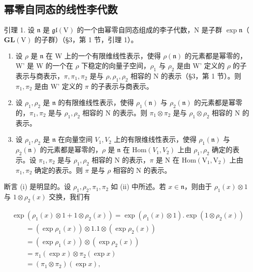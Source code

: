 \subsection{幂零自同态的线性李代数}

引理 1. 设 \(\mathfrak{n}\) 是 \(\mathfrak{gl}(\mathrm{V})\) 的一个由幂零自同态组成的李子代数，\(\mathrm{N}\) 是子群 \(\exp \mathfrak{n}\)（\(\mathbf{GL}(\mathrm{V})\) 的子群）（§3，第 1 节，引理 1）。

\begin{enumerate}
\def\labelenumi{(\roman{enumi})}
\item
  设 \(\rho\) 是 \(\mathfrak{n}\) 在 W 上的一个有限维线性表示，使得 \(\rho(\mathfrak{n})\) 的元素都是幂零的，W' 是 W 的一个在 \(\rho\) 下稳定的向量子空间，\(\rho_1\) 与 \(\rho_2\) 是由 W' 定义的 \(\rho\) 的子表示与商表示，\(\pi, \pi_1, \pi_2\) 是与 \(\rho, \rho_1, \rho_2\) 相容的 N 的表示（§3，第 1 节）。则 \(\pi_1, \pi_2\) 是由 W' 定义的 \(\pi\) 的子表示与商表示。
\item
  设 \(\rho_1, \rho_2\) 是 \(\mathfrak{n}\) 的有限维线性表示，使得 \(\rho_1(\mathfrak{n})\) 与 \(\rho_2(\mathfrak{n})\) 的元素都是幂零的，\(\pi_1, \pi_2\) 是与 \(\rho_1, \rho_2\) 相容的 N 的表示。则 \(\pi_1 \otimes \pi_2\) 是与 \(\rho_1 \otimes \rho_2\) 相容的 N 的表示。
\item
  设 \(\rho_{1},\rho_{2}\) 是 \(\mathfrak{n}\) 在向量空间 \(V_{1},V_{2}\) 上的有限维线性表示，使得 \(\rho_1(\mathfrak{n})\) 与 \(\rho_{2}(\mathfrak{n})\) 的元素都是幂零的，\(\rho\) 是 \(\mathfrak{n}\) 在 \(\mathrm{Hom}(V_1,V_2)\) 上由 \(\rho_{1},\rho_{2}\) 确定的表示。设 \(\pi_1,\pi_2\) 是与 \(\rho_{1},\rho_{2}\) 相容的 N 的表示，\(\pi\) 是 N 在 \(\mathrm{Hom}(\mathrm{V}_1,\mathrm{V}_2)\) 上由 \(\pi_1,\pi_2\) 确定的表示。则 \(\pi\) 是与 \(\rho\) 相容的 N 的表示。
\end{enumerate}

断言 (i) 是明显的。设 \(\rho_1, \rho_2, \pi_1, \pi_2\) 如 (ii) 中所述。若 \(x \in \mathfrak{n}\)，则由于 \(\rho_1(x) \otimes 1\) 与 \(1 \otimes \rho_2(x)\) 交换，我们有

\[
\begin{array}{l} \exp (\rho_ {1} (x) \otimes 1 + 1 \otimes \rho_ {2} (x)) = \exp (\rho_ {1} (x) \otimes 1). \exp (1 \otimes \rho_ {2} (x)) \\ \qquad = (\exp \rho_ {1} (x)) \otimes 1. 1 \otimes (\exp \rho_ {2} (x)) \\ \qquad = (\exp \rho_ {1} (x)) \otimes (\exp \rho_ {2} (x)) \\ \qquad = \pi_ {1} (\exp x) \otimes \pi_ {2} (\exp x) \\ \qquad = (\pi_ {1} \otimes \pi_ {2}) (\exp x), \end{array}
\]

